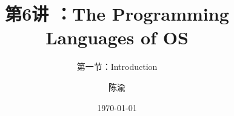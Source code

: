 


\title[第6讲]{第6讲 ：The Programming Languages of OS} %
\subtitle{第一节：Introduction }
\author{陈渝} %
\date{\today} %




\begin{frame}
\titlepage %
\end{frame}

